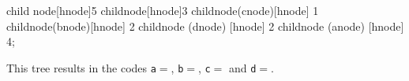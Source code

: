 \begin{Answer}[ref={nuther}]
  \begin{huffmanc}

    child {node[hnode]{5}
      child{node[hnode]{3}
        child{node(cnode)[hnode] {1}}
        child{node(bnode)[hnode] {2}}}
      child{node (dnode) [hnode] {2}}}
    child{node (anode) [hnode] {4}};


  \end{huffmanc}

  This tree results in the codes \texttt{a}$=$,
  \texttt{b}$=$, \texttt{c}$=$ and
  \texttt{d}$=$.

\end{Answer}